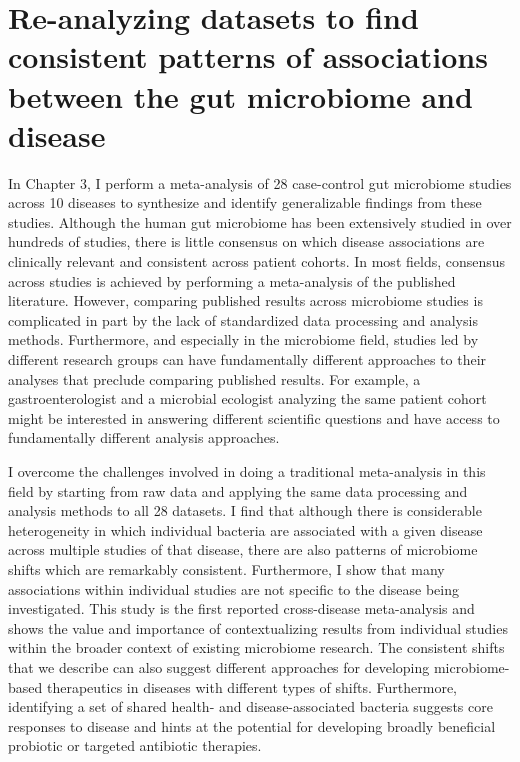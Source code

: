\section{Re-analyzing datasets to find consistent patterns of associations between the gut microbiome and disease}

In Chapter 3, I perform a meta-analysis of 28 case-control gut microbiome studies across 10 diseases to synthesize and identify generalizable findings from these studies.
Although the human gut microbiome has been extensively studied in over hundreds of studies, there is little consensus on which disease associations are clinically relevant and consistent across patient cohorts.
In most fields, consensus across studies is achieved by performing a meta-analysis of the published literature.
However, comparing published results across microbiome studies is complicated in part by the lack of standardized data processing and analysis methods.
Furthermore, and especially in the microbiome field, studies led by different research groups can have fundamentally different approaches to their analyses that preclude comparing published results.
For example, a gastroenterologist and a microbial ecologist analyzing the same patient cohort might be interested in answering different scientific questions and have access to fundamentally different analysis approaches.

I overcome the challenges involved in doing a traditional meta-analysis in this field by starting from raw data and applying the same data processing and analysis methods to all 28 datasets.
I find that although there is considerable heterogeneity in which individual bacteria are associated with a given disease across multiple studies of that disease, there are also patterns of microbiome shifts which are remarkably consistent.
Furthermore, I show that many associations within individual studies are not specific to the disease being investigated.
This study is the first reported cross-disease meta-analysis and shows the value and importance of contextualizing results from individual studies within the broader context of existing microbiome research.
The consistent shifts that we describe can also suggest different approaches for developing microbiome-based therapeutics in diseases with different types of shifts.
Furthermore, identifying a set of shared health- and disease-associated bacteria suggests core responses to disease and hints at the potential for developing broadly beneficial probiotic or targeted antibiotic therapies.

